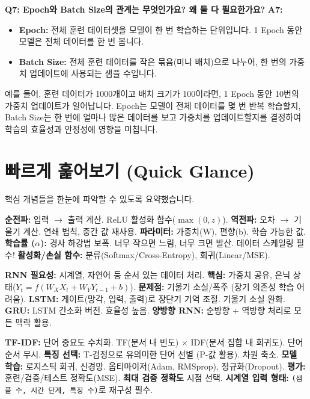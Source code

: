 \documentclass[11pt,a4paper]{book}
\theoremstyle{definition}
\begin{document}
\begin{tcolorbox}[title={\textbf{자주 묻는 질문}}]
\textbf{Q7: Epoch와 Batch Size의 관계는 무엇인가요? 왜 둘 다 필요한가요?}
\textbf{A7:}
\begin{itemize}
    \item \textbf{Epoch:} 전체 훈련 데이터셋을 모델이 한 번 학습하는 단위입니다. 1 Epoch 동안 모델은 전체 데이터를 한 번 봅니다.
    \item \textbf{Batch Size:} 전체 훈련 데이터를 작은 묶음(미니 배치)으로 나누어, 한 번의 가중치 업데이트에 사용되는 샘플 수입니다.
\end{itemize}
예를 들어, 훈련 데이터가 1000개이고 배치 크기가 100이라면, 1 Epoch 동안 10번의 가중치 업데이트가 일어납니다. Epoch는 모델이 전체 데이터를 몇 번 반복 학습할지, Batch Size는 한 번에 얼마나 많은 데이터를 보고 가중치를 업데이트할지를 결정하여 학습의 효율성과 안정성에 영향을 미칩니다.
\end{tcolorbox}


\section{빠르게 훑어보기 (Quick Glance)}
핵심 개념들을 한눈에 파악할 수 있도록 요약했습니다.

\begin{tcolorbox}[colback=myblue!10!white, colframe=myblue!75!black, title={\textbf{신경망 기본}}]
\textbf{순전파:} 입력 $\rightarrow$ 출력 계산. ReLU 활성화 함수($\max(0,z)$).
\textbf{역전파:} 오차 $\rightarrow$ 기울기 계산. 연쇄 법칙, 중간 값 재사용.
\textbf{파라미터:} 가중치(W), 편향(b). 학습 가능한 값.
\textbf{학습률 ($\alpha$):} 경사 하강법 보폭. 너무 작으면 느림, 너무 크면 발산. 데이터 스케일링 필수!
\textbf{활성화/손실 함수:} 분류(Softmax/Cross-Entropy), 회귀(Linear/MSE).
\end{tcolorbox}

\begin{tcolorbox}[colback=mygreen!10!white, colframe=mygreen!75!black, title={\textbf{시퀀스 데이터와 RNN}}]
\textbf{RNN 필요성:} 시계열, 자연어 등 순서 있는 데이터 처리.
\textbf{핵심:} 가중치 공유, 은닉 상태($Y_t = f(W_X X_t + W_Y Y_{t-1} + b)$).
\textbf{문제점:} 기울기 소실/폭주 (장기 의존성 학습 어려움).
\textbf{LSTM:} 게이트(망각, 입력, 출력)로 장단기 기억 조절. 기울기 소실 완화.
\textbf{GRU:} LSTM 간소화 버전. 효율성 높음.
\textbf{양방향 RNN:} 순방향 + 역방향 처리로 모든 맥락 활용.
\end{tcolorbox}

\begin{tcolorbox}[colback=myorange!10!white, colframe=myorange!75!black, title={\textbf{텍스트 처리 및 모델 평가}}]
\textbf{TF-IDF:} 단어 중요도 수치화. TF(문서 내 빈도) $\times$ IDF(문서 집합 내 희귀도). 단어 순서 무시.
\textbf{특징 선택:} T-검정으로 유의미한 단어 선별 (P-값 활용). 차원 축소.
\textbf{모델 학습:} 로지스틱 회귀, 신경망. 옵티마이저(Adam, RMSprop), 정규화(Dropout).
\textbf{평가:} 훈련/검증/테스트 정확도(MSE). \textbf{최대 검증 정확도} 시점 선택.
\textbf{시계열 입력 형태:} \texttt{(샘플 수, 시간 단계, 특징 수)}로 재구성 필수.
\end{tcolorbox}
\end{document}
